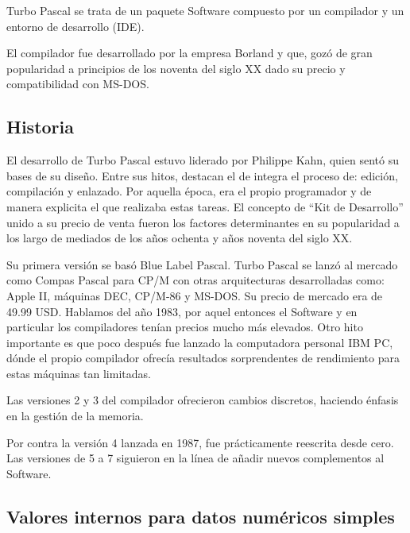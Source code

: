 %

Turbo Pascal se trata de un paquete Software compuesto por un compilador y
un entorno de desarrollo (IDE). 

El compilador fue desarrollado por la empresa Borland y que, gozó de gran popularidad a principios de los noventa del siglo XX dado su precio y compatibilidad con MS-DOS.

\subsection{Historia}

El desarrollo de Turbo Pascal estuvo liderado por Philippe
Kahn, quien sentó su bases de su diseño. 
Entre
sus hitos, destacan el de integra el proceso de: edición, compilación y 
enlazado.
Por aquella época, era el propio programador y de manera explicita el que
realizaba estas tareas. El concepto de ``Kit de Desarrollo'' unido a su precio
de venta fueron los factores determinantes en su popularidad a los largo de
mediados de los años ochenta y años noventa del siglo XX.


Su primera versión se basó Blue Label Pascal.
Turbo Pascal se lanzó al mercado como Compas Pascal para CP/M con otras
arquitecturas desarrolladas como: Apple II, máquinas DEC, CP/M-86 y MS-DOS. Su
precio de mercado era de 49.99 USD. Hablamos del año 1983, por aquel
entonces el Software y en particular los compiladores tenían precios mucho más
elevados. Otro hito importante es que poco después fue lanzado la computadora
personal IBM PC, dónde el propio compilador ofrecía resultados sorprendentes de
rendimiento para estas máquinas tan limitadas. 


Las versiones 2 y 3 del compilador ofrecieron cambios discretos, haciendo
énfasis en la gestión de la memoria.


Por contra la versión 4 lanzada en 1987, fue prácticamente reescrita desde cero.
Las versiones de 5 a 7 siguieron en la línea de añadir nuevos complementos al
Software. 

\subsection{Valores internos para datos numéricos simples}

